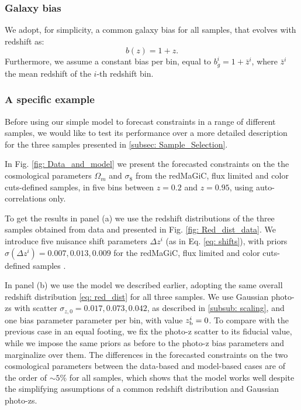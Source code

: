 \documentclass[a4paper,fleqn,usenatbib]{mnras}
\begin{document}
\subsubsection{Galaxy bias}

We adopt, for simplicity, a common  galaxy bias for all samples, that evolves with redshift as:
\begin{equation}
b(z) = 1 + z.
\end{equation}
Furthermore, we assume a constant bias per bin, equal to $b_g^i = 1 + \bar{z}^i$, where $\bar{z}^i$ the mean redshift of the $i$-th redshift bin.

\subsubsection{A specific example}
\label{subsub: example}

Before using our simple model to forecast constraints in a range of different samples, we would like to test its performance over a more detailed description for the three samples presented in \ref{subsec: Sample_Selection}.

In Fig. \ref{fig: Data_and_model} we present the forecasted constraints on the the cosmological parameters $\Omega_{m}$ and $\sigma_8$ from the redMaGiC, flux limited and color cuts-defined samples, in five bins between $z=0.2$ and $z=0.95$, using auto-correlations only.

To get the results in panel (a) we use the redshift distributions of the three samples obtained from data and presented in Fig. \ref{fig: Red_dist_data}. We introduce five nuisance shift parameters $\Delta z^i$ (as in Eq. \ref{eq: shifts}), with priors $\sigma(\Delta z^i) = 0.007, 0.013, 0.009$ for the redMaGiC, flux limited and color cuts-defined samples \citep{DES1}. 

In panel (b) we use the model we described earlier, adopting the same overall redshift distribution \eqref{eq: red_dist} for all three samples. We use Gaussian photo-zs with scatter $\sigma_{z,0} = 0.017, 0.073, 0.042$, as described in \ref{subsub: scaling}, and one bias parameter parameter per bin, with value $z_{\mbox{\scriptsize{b}}}^i = 0$. To compare with the previous case in an equal footing, we fix the photo-z scatter to its fiducial value, while we impose the same priors as before to the photo-z bias parameters and marginalize over them. The differences in the forecasted constraints on the two cosmological parameters between the  data-based and model-based cases are of the order of $\sim 5\%$ for all samples, which shows that the model works well despite the simplifying assumptions of a common redshift distribution and Gaussian photo-zs.
\end{document}
